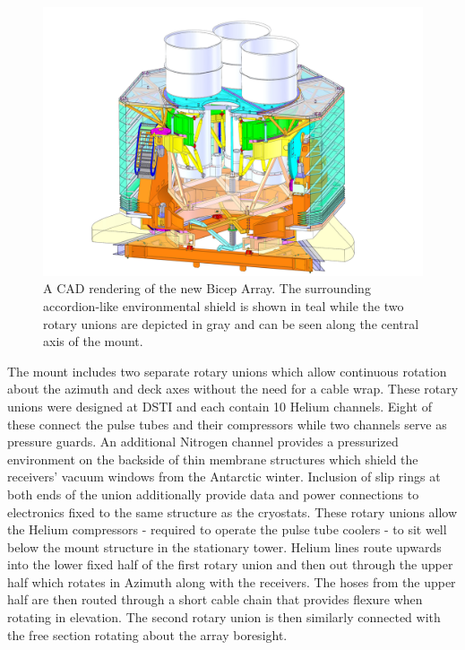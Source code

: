 \documentclass[]{spie}  %
\begin{document}
\begin{figure} [hb]
	\begin{center}
		\includegraphics[scale=0.4]{BA_mount_isosection.JPG}
	\end{center}
	\caption{A CAD rendering of the new Bicep Array. The surrounding
	accordion-like environmental shield is shown in teal while the two rotary
	unions are depicted in gray and can be seen along the central axis of the
	mount.}
	\label{fig:bamount}
\end{figure}



The \biceparray mount includes two separate rotary unions which allow
continuous rotation about the azimuth and deck axes without the need for a
cable wrap. These rotary unions were designed at DSTI and each contain 10
Helium channels. Eight of these connect the pulse tubes and their compressors
while two channels serve as pressure guards. An additional Nitrogen channel
provides a pressurized environment on the backside of thin membrane
structures which shield the receivers' vacuum windows from the Antarctic winter.
Inclusion of slip rings at both ends of the union additionally provide data and power
connections to electronics fixed to the same structure as the cryostats. These rotary
unions allow the Helium compressors - required to operate the
pulse tube coolers - to sit well below the mount structure in the
stationary tower. Helium lines route upwards into the lower fixed half of the first
rotary union and then out through the upper half which rotates in Azimuth
along with the receivers. The hoses from the upper half are then routed through a
short cable chain that provides flexure when rotating in elevation. The
second rotary union is then similarly connected with the free section rotating
about the array boresight.
\end{document}
